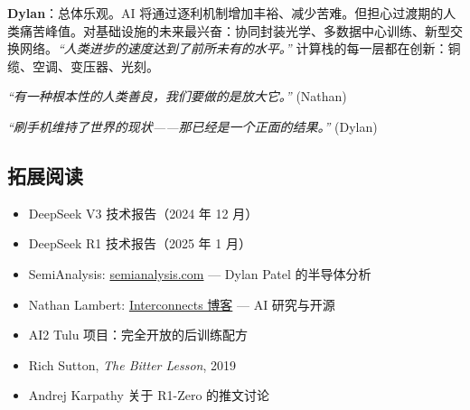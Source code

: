 \documentclass[a4paper]{article}
\begin{document}
\textbf{Dylan}：总体乐观。AI 将通过逐利机制增加丰裕、减少苦难。但担心过渡期的人类痛苦峰值。对基础设施的未来最兴奋：协同封装光学、多数据中心训练、新型交换网络。\textit{``人类进步的速度达到了前所未有的水平。''} 计算栈的每一层都在创新：铜缆、空调、变压器、光刻。

\textit{``有一种根本性的人类善良，我们要做的是放大它。''} (Nathan)

\textit{``刷手机维持了世界的现状——那已经是一个正面的结果。''} (Dylan)

\subsection{拓展阅读}

\begin{itemize}
    \item DeepSeek V3 技术报告（2024 年 12 月）
    \item DeepSeek R1 技术报告（2025 年 1 月）
    \item SemiAnalysis: \href{https://semianalysis.com}{semianalysis.com} — Dylan Patel 的半导体分析
    \item Nathan Lambert: \href{https://www.interconnects.ai}{Interconnects 博客} — AI 研究与开源
    \item AI2 Tulu 项目：完全开放的后训练配方
    \item Rich Sutton, \textit{The Bitter Lesson}, 2019
    \item Andrej Karpathy 关于 R1-Zero 的推文讨论
\end{itemize}
\end{document}
